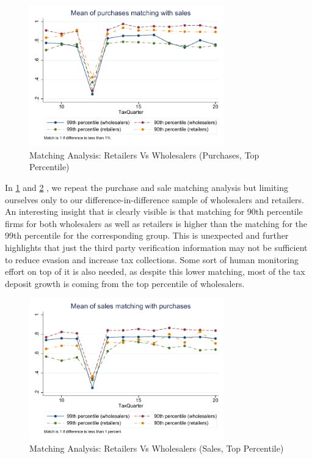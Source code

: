 \begin{figure}[H] 
\centering
\includegraphics[width=0.75\textwidth]{graphs/AvgMatch_trend_DiffLessThan1percent.pdf}
\caption{Matching Analysis: Retailers Vs Wholesalers (Purchases, Top Percentile)}
\label{fig:matching_retailerswholesalers}
\end{figure}

In \cref{fig:matching_retailerswholesalers} and \cref{fig:matching_retailerswholesalers_sales} , we repeat the purchase and sale matching analysis but limiting ourselves only to our difference-in-difference sample of wholesalers and retailers. An interesting insight that is clearly visible is that matching for 90th percentile firms for both wholesalers as well as retailers is higher than the matching for the 99th percentile for the corresponding group. This is unexpected and further highlights that just the third party verification information may not be sufficient to reduce evasion and increase tax collections. Some sort of human monitoring effort on top of it is also needed, as despite this lower matching, most of the tax deposit growth is coming from the top percentile of wholesalers.

\begin{figure}[H] 
\centering
\includegraphics[width=0.75\textwidth]{graphs/SalesAvgMatch_trend_DiffLessThan1percent.pdf}
\caption{Matching Analysis: Retailers Vs Wholesalers (Sales, Top Percentile)}
\label{fig:matching_retailerswholesalers_sales}
\end{figure}
\pagebreak

